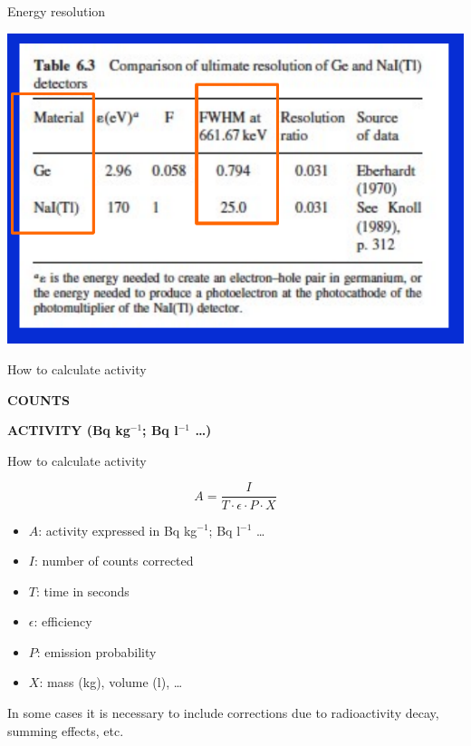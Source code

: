 \begin{frame}{Energy resolution}

\centering
\includegraphics[scale=0.4]{figures/comparisonresolution.png}

\end{frame}

\begin{frame}{How to calculate activity}

\begin{block}{}
\centering \textbf{COUNTS}
\end{block}

\centering \arrowdown

\begin{block}{}
\centering \textbf{ACTIVITY (Bq kg$^{-1}$; Bq l$^{-1}$ \ldots)}
\end{block}

\end{frame}


\begin{frame}{How to calculate activity}

\begin{block}{}
\centering 
\[A = \frac{I}{T\cdot \epsilon \cdot P \cdot X}\]
\end{block}

\begin{block}{}

\begin{itemize}
\item $A$: activity expressed in Bq kg$^{-1}$; Bq l$^{-1}$ \ldots
\item $I$: number of counts corrected
\item $T$: time in seconds
\item $\epsilon$: efficiency
\item $P$: emission probability
\item $X$: mass (kg), volume (l), \ldots
\end{itemize}

In some cases it is necessary to include corrections due to radioactivity decay, summing effects, etc.

\end{block}

\end{frame}

